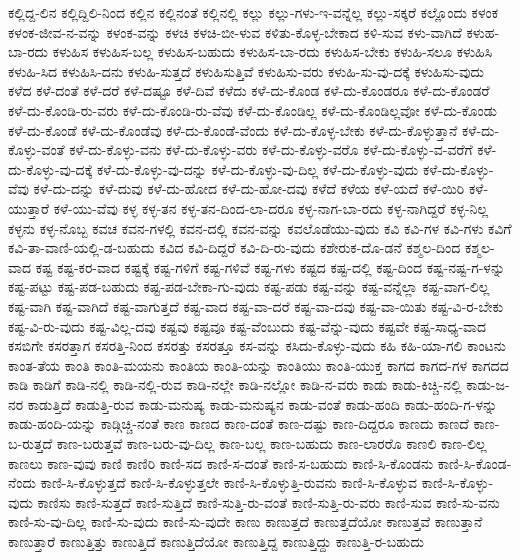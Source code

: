 {ಕಲ್ಲಿದ್ದ-ಲಿನ
ಕಲ್ಲಿದ್ದಿಲಿ-ನಿಂದ
ಕಲ್ಲಿನ
ಕಲ್ಲಿನಂತೆ
ಕಲ್ಲಿನಲ್ಲಿ
ಕಲ್ಲು
ಕಲ್ಲು-ಗಳು-ಇ-ವನ್ನೆಲ್ಲ
ಕಲ್ಲು-ಸಕ್ಕರೆ
ಕಲ್ಲೊಂದು
ಕಳಂಕ
ಕಳಂಕ-ಜೀವ-ನ-ವನ್ನು
ಕಳಂಕ-ವನ್ನು
ಕಳಚಿ
ಕಳಚಿ-ಬೀ-ಳುವ
ಕಳಿತು-ಕೊಳ್ಳ-ಬೇಕಾದ
ಕಳಿ-ಸುವ
ಕಳು-ವಾಗಿದೆ
ಕಳುಹ-ಬಾ-ರದು
ಕಳುಹಿಸ
ಕಳುಹಿಸ-ಬಲ್ಲ
ಕಳುಹಿಸ-ಬಹುದು
ಕಳುಹಿಸ-ಬಾ-ರದು
ಕಳುಹಿಸ-ಬೇಕು
ಕಳುಹಿ-ಸಲೂ
ಕಳುಹಿಸಿ
ಕಳುಹಿ-ಸಿದ
ಕಳುಹಿಸಿ-ದನು
ಕಳುಹಿ-ಸುತ್ತದೆ
ಕಳುಹಿಸುತ್ತಿವೆ
ಕಳುಹಿಸು-ವರು
ಕಳುಹಿ-ಸು-ವು-ದಕ್ಕೆ
ಕಳುಹಿಸು-ವುದು
ಕಳೆದ
ಕಳೆ-ದಂತೆ
ಕಳೆ-ದರೆ
ಕಳೆ-ದಷ್ಟೂ
ಕಳೆ-ದಿವೆ
ಕಳೆದು
ಕಳೆ-ದು-ಕೊಂಡ
ಕಳೆ-ದು-ಕೊಂಡರೂ
ಕಳೆ-ದು-ಕೊಂಡರೆ
ಕಳೆ-ದು-ಕೊಂಡಿ-ರು-ವರು
ಕಳೆ-ದು-ಕೊಂಡಿ-ರು-ವೆವು
ಕಳೆ-ದು-ಕೊಂಡಿಲ್ಲ
ಕಳೆ-ದು-ಕೊಂಡಿಲ್ಲವೋ
ಕಳೆ-ದು-ಕೊಂಡು
ಕಳೆ-ದು-ಕೊಂಡೆ
ಕಳೆ-ದು-ಕೊಂಡೆವು
ಕಳೆ-ದು-ಕೊಂಡೆ-ವೆಂದು
ಕಳೆ-ದು-ಕೊಳ್ಳ-ಬೇಕು
ಕಳೆ-ದು-ಕೊಳ್ಳುತ್ತಾನೆ
ಕಳೆ-ದು-ಕೊಳ್ಳು-ವಂತೆ
ಕಳೆ-ದು-ಕೊಳ್ಳು-ವನು
ಕಳೆ-ದು-ಕೊಳ್ಳು-ವರು
ಕಳೆ-ದು-ಕೊಳ್ಳು-ವರೊ
ಕಳೆ-ದು-ಕೊಳ್ಳು-ವ-ವರೆಗೆ
ಕಳೆ-ದು-ಕೊಳ್ಳು-ವು-ದಕ್ಕೆ
ಕಳೆ-ದು-ಕೊಳ್ಳು-ವು-ದನ್ನು
ಕಳೆ-ದು-ಕೊಳ್ಳು-ವು-ದಿಲ್ಲ
ಕಳೆ-ದು-ಕೊಳ್ಳು-ವುದು
ಕಳೆ-ದು-ಕೊಳ್ಳು-ವೆವು
ಕಳೆ-ದು-ದನ್ನು
ಕಳೆ-ದುವು
ಕಳೆ-ದು-ಹೋದ
ಕಳೆ-ದು-ಹೋ-ದವು
ಕಳೆದೆ
ಕಳೆಯ
ಕಳೆ-ಯದೆ
ಕಳೆ-ಯಿರಿ
ಕಳೆ-ಯುತ್ತಾರೆ
ಕಳೆ-ಯು-ವೆವು
ಕಳ್ಳ
ಕಳ್ಳ-ತನ
ಕಳ್ಳ-ತನ-ದಿಂದ-ಲಾ-ದರೂ
ಕಳ್ಳ-ನಾಗ-ಬಾ-ರದು
ಕಳ್ಳ-ನಾಗಿದ್ದರೆ
ಕಳ್ಳ-ನಿಲ್ಲ
ಕಳ್ಳನು
ಕಳ್ಳ-ನೊಬ್ಬ
ಕವಚ
ಕವನ-ಗಳಲ್ಲಿ
ಕವನ-ದಲ್ಲಿ
ಕವನ-ವನ್ನು
ಕವಲೊಡೆಯು-ವುದು
ಕವಿ
ಕವಿ-ಗಳ
ಕವಿ-ಗಳು
ಕವಿಗೆ
ಕವಿ-ತಾ-ವಾಣಿ-ಯಲ್ಲಿ-ಡ-ಬಹುದು
ಕವಿದ
ಕವಿ-ದಿದ್ದರೆ
ಕವಿ-ದಿ-ರು-ವುದು
ಕಶೇರುಕ-ದೊ-ಡನೆ
ಕಶ್ಮಲ-ದಿಂದ
ಕಶ್ಮಲ-ವಾದ
ಕಷ್ಟ
ಕಷ್ಟ-ಕರ-ವಾದ
ಕಷ್ಟಕ್ಕೆ
ಕಷ್ಟ-ಗಳಿಗೆ
ಕಷ್ಟ-ಗಳಿವೆ
ಕಷ್ಟ-ಗಳು
ಕಷ್ಟದ
ಕಷ್ಟ-ದಲ್ಲಿ
ಕಷ್ಟ-ದಿಂದ
ಕಷ್ಟ-ನಷ್ಟ-ಗ-ಳನ್ನು
ಕಷ್ಟ-ಪಟ್ಟು
ಕಷ್ಟ-ಪಡ-ಬಹುದು
ಕಷ್ಟ-ಪಡ-ಬೇಕಾ-ಗು-ವುದು
ಕಷ್ಟ-ಪಡು
ಕಷ್ಟ-ವನ್ನು
ಕಷ್ಟ-ವನ್ನೆಲ್ಲಾ
ಕಷ್ಟ-ವಾಗ-ಲಿಲ್ಲ
ಕಷ್ಟ-ವಾಗಿ
ಕಷ್ಟ-ವಾಗಿದೆ
ಕಷ್ಟ-ವಾಗುತ್ತದೆ
ಕಷ್ಟ-ವಾದ
ಕಷ್ಟ-ವಾ-ದರೆ
ಕಷ್ಟ-ವಾ-ದವು
ಕಷ್ಟ-ವಾ-ಯಿತು
ಕಷ್ಟ-ವಿ-ರ-ಬೇಕು
ಕಷ್ಟ-ವಿ-ರು-ವುದು
ಕಷ್ಟ-ವಿಲ್ಲ-ದವು
ಕಷ್ಟವು
ಕಷ್ಟವೂ
ಕಷ್ಟ-ವೆಂಬುದು
ಕಷ್ಟ-ವೆನ್ನು-ವುದು
ಕಷ್ಟವೇ
ಕಷ್ಟ-ಸಾಧ್ಯ-ವಾದ
ಕಸಬಿಗೇ
ಕಸರತ್ತಾಗ
ಕಸರತ್ತಿ-ನಿಂದ
ಕಸರತ್ತು
ಕಸರತ್ತೂ
ಕಸ-ವನ್ನು
ಕಸಿದು-ಕೊಳ್ಳು-ವುದು
ಕಹಿ
ಕಹಿ-ಯಾ-ಗಲಿ
ಕಾಂಟನು
ಕಾಂತ-ತೆಯ
ಕಾಂತಿ
ಕಾಂತಿ-ಮಯನು
ಕಾಂತಿಯ
ಕಾಂತಿ-ಯನ್ನು
ಕಾಂತಿಯು
ಕಾಂತಿ-ಯುಕ್ತ
ಕಾಗದ
ಕಾಗದ-ಗಳ
ಕಾಗದದ
ಕಾಡಿ
ಕಾಡಿಗೆ
ಕಾಡಿ-ನಲ್ಲಿ
ಕಾಡಿ-ನಲ್ಲಿ-ರುವ
ಕಾಡಿ-ನಲ್ಲೇ
ಕಾಡಿ-ನಲ್ಲೋ
ಕಾಡಿ-ನ-ವರು
ಕಾಡು
ಕಾಡು-ಕಿಚ್ಚಿ-ನಲ್ಲಿ
ಕಾಡು-ಜ-ನರ
ಕಾಡುತ್ತಿದೆ
ಕಾಡುತ್ತಿ-ರುವ
ಕಾಡು-ಮನುಷ್ಯ
ಕಾಡು-ಮನುಷ್ಯನ
ಕಾಡು-ವಂತೆ
ಕಾಡು-ಹಂದಿ
ಕಾಡು-ಹಂದಿ-ಗ-ಳನ್ನು
ಕಾಡು-ಹಂದಿ-ಯನ್ನು
ಕಾಡ್ಗಿಚ್ಚಿ-ನಂತೆ
ಕಾಣ
ಕಾಣದ
ಕಾಣ-ದಂತೆ
ಕಾಣ-ದಷ್ಟು
ಕಾಣ-ದಿದ್ದರೂ
ಕಾಣದು
ಕಾಣದೆ
ಕಾಣ-ಬ-ರುತ್ತದೆ
ಕಾಣ-ಬರುತ್ತವೆ
ಕಾಣ-ಬರು-ವು-ದಿಲ್ಲ
ಕಾಣ-ಬಲ್ಲ
ಕಾಣ-ಬಹುದು
ಕಾಣ-ಲಾರರೊ
ಕಾಣಲಿ
ಕಾಣ-ಲಿಲ್ಲ
ಕಾಣಲು
ಕಾಣ-ವುವು
ಕಾಣಿ
ಕಾಣಿರಿ
ಕಾಣಿ-ಸದ
ಕಾಣಿ-ಸ-ದಂತೆ
ಕಾಣಿ-ಸ-ಬಹುದು
ಕಾಣಿ-ಸಿ-ಕೊಂಡನು
ಕಾಣಿ-ಸಿ-ಕೊಂಡ-ನೆಂದು
ಕಾಣಿ-ಸಿ-ಕೊಳ್ಳುತ್ತದೆ
ಕಾಣಿ-ಸಿ-ಕೊಳ್ಳುತ್ತಲೇ
ಕಾಣಿ-ಸಿ-ಕೊಳ್ಳುತ್ತಿ-ರುವನು
ಕಾಣಿ-ಸಿ-ಕೊಳ್ಳುವ
ಕಾಣಿ-ಸಿ-ಕೊಳ್ಳು-ವುದು
ಕಾಣಿಸು
ಕಾಣಿ-ಸುತ್ತದೆ
ಕಾಣಿ-ಸುತ್ತಿದೆ
ಕಾಣಿ-ಸುತ್ತಿ-ರು-ವಂತೆ
ಕಾಣಿ-ಸುತ್ತಿ-ರು-ವರು
ಕಾಣಿ-ಸುವ
ಕಾಣಿ-ಸು-ವನು
ಕಾಣಿ-ಸು-ವು-ದಿಲ್ಲ
ಕಾಣಿ-ಸು-ವುದು
ಕಾಣಿ-ಸು-ವುದೇ
ಕಾಣು
ಕಾಣುತ್ತದೆ
ಕಾಣುತ್ತದೆಯೋ
ಕಾಣುತ್ತವೆ
ಕಾಣುತ್ತಾನೆ
ಕಾಣುತ್ತಾರೆ
ಕಾಣುತ್ತಿತ್ತು
ಕಾಣುತ್ತಿದೆ
ಕಾಣುತ್ತಿದೆಯೋ
ಕಾಣುತ್ತಿದ್ದ
ಕಾಣುತ್ತಿದ್ದು
ಕಾಣುತ್ತಿ-ರ-ಬಹುದು
}
